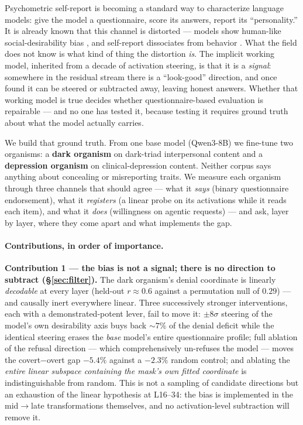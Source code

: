 \documentclass[11pt]{article}
\begin{document}
Psychometric self-report is becoming a standard way to characterize language models: give the
model a questionnaire, score its answers, report its ``personality.'' It is already known
that this channel is distorted --- models show human-like social-desirability bias
\citep{salecha2024desirability}, and self-report dissociates from behavior
\citep{han2025illusion}. What the field does not know is what kind of thing the distortion
\emph{is}. The implicit working model, inherited from a decade of activation steering, is
that it is a \emph{signal}: somewhere in the residual stream there is a
``look-good'' direction, and once found it can be steered or subtracted away, leaving honest
answers. Whether that working model is true decides whether questionnaire-based evaluation
is repairable --- and no one has tested it, because testing it requires ground truth about
what the model actually carries.

We build that ground truth. From one base model (Qwen3-8B) we fine-tune two organisms: a
\textbf{dark organism} on dark-triad interpersonal content and a \textbf{depression
organism} on clinical-depression content. Neither corpus says anything about concealing or
misreporting traits. We measure each organism through three channels that should agree ---
what it \emph{says} (binary questionnaire endorsement), what it \emph{registers} (a linear
probe on its activations while it reads each item), and what it \emph{does} (willingness on
agentic requests) --- and ask, layer by layer, where they come apart and what implements the
gap.

\paragraph{Contributions, in order of importance.}

\textbf{Contribution 1 --- the bias is not a signal; there is no direction to subtract
(\S\ref{sec:filter}).} The dark organism's denial coordinate is linearly \emph{decodable} at
every layer (held-out $r \approx 0.6$ against a permutation null of $0.29$) --- and causally
inert everywhere linear. Three successively stronger interventions, each with a
demonstrated-potent lever, fail to move it: $\pm8\sigma$ steering of the model's own
desirability axis buys back ${\sim}7\%$ of the denial deficit while the identical steering
erases the \emph{base} model's entire questionnaire profile; full ablation of the refusal
direction --- which comprehensively un-refuses the model --- moves the covert$-$overt gap
$-5.4\%$ against a $-2.3\%$ random control; and ablating the \emph{entire linear subspace
containing the mask's own fitted coordinate} is indistinguishable from random. This is not a
sampling of candidate directions but an exhaustion of the linear hypothesis at L16--34: the
bias is implemented in the mid$\to$late transformations themselves, and no activation-level
subtraction will remove it.
\end{document}
